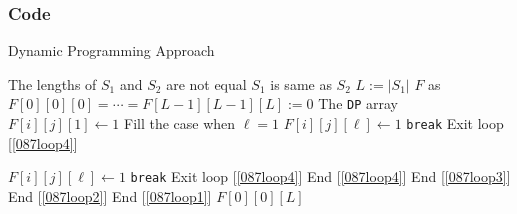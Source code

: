 \subsubsection{Code}
\begin{algorithm}[H]
\caption{Dynamic Programming Approach}
\begin{algorithmic}[1]
 \Comment The lengths of $S_1$ and $S_2$ are not equal
\State {}
\EndIf
{} \Comment $S_1$ is same as $S_2$
\State {}
\EndIf
\State $L:=|S_1|$
\State $F$ as $F[0][0][0]=\cdots=F[L-1][L-1][L]:=0$ \Comment The \texttt{DP} array
\State $F[i][j][1]\gets 1$ \Comment Fill the case when $\ell=1$
\EndIf
\EndFor
\EndFor
{} \label{087loop1}
 \label{087loop2}
 \label{087loop3}
 \label{087loop4}
\State $F[i][j][\ell]\gets 1$
\State \texttt{break} \Comment Exit loop [\ref{087loop4}]
\EndIf
{}
\end{algorithmic}
\end{algorithm}
\begin{algorithm}[H]
\begin{algorithmic}[1]
\State $F[i][j][\ell]\gets 1$
\State \texttt{break} \Comment Exit loop [\ref{087loop4}]
\EndIf
\EndFor \Comment End [\ref{087loop4}]
\EndFor \Comment End [\ref{087loop3}]
\EndFor \Comment End [\ref{087loop2}]
\EndFor \Comment End [\ref{087loop1}]
\State \Return $F[0][0][L]$
\EndProcedure
\end{algorithmic}
\end{algorithm}